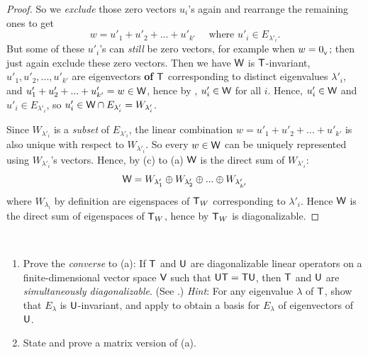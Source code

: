 \begin{proof}
So we \emph{exclude} those zero vectors \(u_i\)'s again and rearrange the remaining ones to get
\[
    w = u'_1 + u'_2 + ... + u'_{k'} \quad \text{ where } u'_i \in E_{\lambda'_i}.
\]
But some of these \(u'_i\)'s can \emph{still} be zero vectors, for example when \(w = 0_{_{\textsf{V}}}\); then just again exclude these zero vectors.
Then we have \(\textsf{W}\) is \(\textsf{T}\)-invariant, \(u'_1, u'_2, ..., u'_{k'}\) are eigenvectors \textbf{of \(\textsf{T}\)} corresponding to distinct eigenvalues \(\lambda'_i\), and \(u'_1 + u'_2 + ... + u'_{k'} = w \in \textsf{W}\), hence by , \(u'_i \in \textsf{W}\) for all \(i\).
Hence, \(u'_i \in \textsf{W}\) and \(u'_i \in E_{\lambda'_i}\), so \(u'_i \in \textsf{W} \cap E_{\lambda'_i} = W_{\lambda'_i}\).

Since \(W_{\lambda'_i}\) is a \emph{subset} of \(E_{\lambda'_i}\), the linear combination \(w = u'_1 + u'_2 + ... + u'_{k'}\) is also unique with respect to \(W_{\lambda'_i}\).
So every \(w \in \textsf{W}\) can be uniquely represented using \(W_{\lambda'_i}\)'s vectors.
Hence, by (c) to (a) \(\textsf{W}\) is the direct sum of \(W_{\lambda'_i}\):
\[
    \textsf{W} = W_{\lambda'_1} \oplus W_{\lambda'_2} \oplus ... \oplus W_{\lambda'_{k'}}
\]
where \(W_{\lambda_i}\) by definition are eigenspaces of \(\textsf{T}_W\) corresponding to \(\lambda'_i\).
Hence \(\textsf{W}\) is the direct sum of eigenspaces of \(\textsf{T}_W\), hence by  \(\textsf{T}_W\) is diagonalizable.
\end{proof}

\begin{exercise} \label{exercise 5.4.25} \ 

\begin{enumerate}
\item Prove the \emph{converse} to (a): If \(\textsf{T}\) and \(\textsf{U}\) are diagonalizable linear operators on a finite-dimensional vector space \(\textsf{V}\) such that \(\textsf{U}\textsf{T} = \textsf{T}\textsf{U}\), then \(\textsf{T}\) and \(\textsf{U}\) are \emph{simultaneously diagonalizable}.
(See .)
\emph{Hint}: For any eigenvalue \(\lambda\) of \(\textsf{T}\), show that \(E_{\lambda}\) is \(\textsf{U}\)-invariant, and apply  to obtain a basis for \(E_{\lambda}\) of eigenvectors of \(\textsf{U}\).
\item State and prove a matrix version of (a).
\end{enumerate}
\end{exercise}

